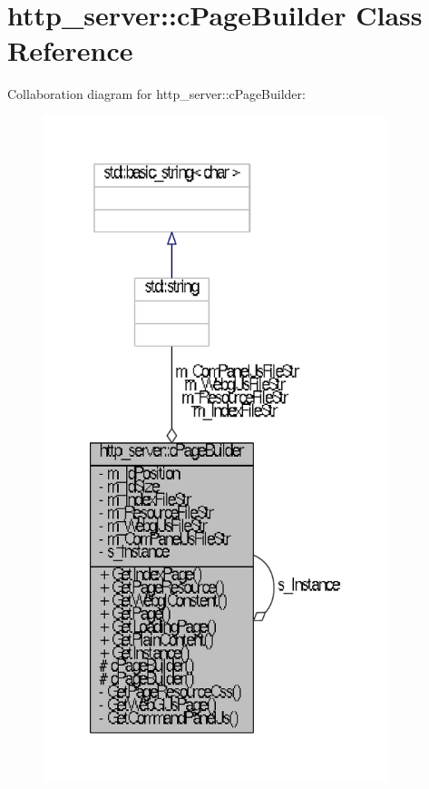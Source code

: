 \hypertarget{classhttp__server_1_1cPageBuilder}{\section{http\-\_\-server\-:\-:c\-Page\-Builder \-Class \-Reference}
\label{classhttp__server_1_1cPageBuilder}
}


\-Collaboration diagram for http\-\_\-server\-:\-:c\-Page\-Builder\-:
\nopagebreak
\begin{figure}[H]
\begin{center}
\leavevmode
\includegraphics[height=550pt]{classhttp__server_1_1cPageBuilder__coll__graph}
\end{center}
\end{figure}
